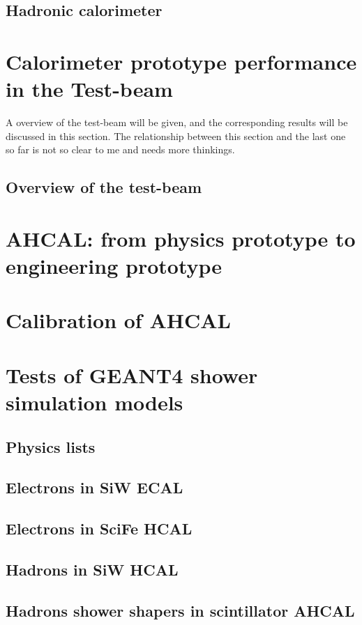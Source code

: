 \subsection{Hadronic calorimeter}

\section{Calorimeter prototype performance in the Test-beam}
\par A overview of the test-beam will be given, and the corresponding results will be discussed in this section. The relationship between this section and the last one so far is not so clear to me and needs more thinkings.

\subsection{Overview of the test-beam}

\section{AHCAL: from physics prototype to engineering prototype}

\section{Calibration of AHCAL}

\section{Tests of GEANT4 shower simulation models}
\subsection{Physics lists}
\subsection{Electrons in SiW ECAL}
\subsection{Electrons in SciFe HCAL}
\subsection{Hadrons in SiW HCAL}
\subsection{Hadrons shower shapers in scintillator AHCAL}
